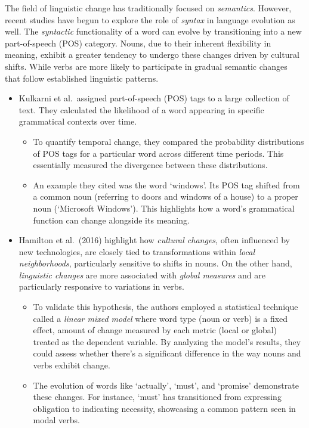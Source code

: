 The field of linguistic change has traditionally focused on \emph{semantics}.
However, recent studies have begun to explore the role of \emph{syntax} in language evolution as well.
The \emph{syntactic} functionality of a word can evolve by transitioning into a new part-of-speech (POS) category.
Nouns, due to their inherent flexibility in meaning, exhibit a greater tendency to undergo these changes driven by cultural shifts.
While verbs are more likely to participate in gradual semantic changes that follow established linguistic patterns.
\vspace{0mm}
\begin{itemize}
    \item {}
    Kulkarni et al.\ assigned part-of-speech (POS) tags to a large collection of text.
    They calculated the likelihood of a word appearing in specific grammatical contexts over time.
    \begin{itemize}
        \item To quantify temporal change, they compared the probability distributions of POS tags for a particular word across different time periods.
        This essentially measured the divergence between these distributions.
        \item An example they cited was the word `windows'.
        Its POS tag shifted from a common noun (referring to doors and windows of a house) to a proper noun (`Microsoft Windows').
        This highlights how a word's grammatical function can change alongside its meaning.
    \end{itemize}

    \item {}
     Hamilton et al.\ (2016) highlight how \emph{cultural changes}, often influenced by new technologies, are closely tied to transformations within \emph{local neighborhoods}, particularly sensitive to shifts in nouns.
     On the other hand, \emph{linguistic changes} are more associated with \emph{global measures} and are particularly responsive to variations in verbs.
     \begin{itemize}
         \item To validate this hypothesis, the authors employed a statistical technique called a \emph{linear mixed model} where word type (noun or verb) is a fixed effect,
         amount of change measured by each metric (local or global) treated as the dependent variable.
         By analyzing the model's results, they could assess whether there's a significant difference in the way nouns and verbs exhibit change.
         \item The evolution of words like `actually', `must', and `promise' demonstrate these changes.
         For instance, `must' has transitioned from expressing obligation to indicating necessity, showcasing a common pattern seen in modal verbs.
     \end{itemize}



\end{itemize}
